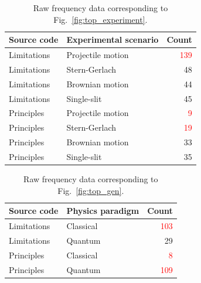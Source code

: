 \documentclass[english,aps,prstper,reprint,showpacs,longbibliography,superscriptaddress,nofootinbib]{revtex4-2}
\begin{document}
\begin{table}[tb] 
  \caption{Raw frequency data corresponding to Fig.~\ref{fig:top_experiment}.}
  \label{ta:top_experiment}
  \begin{ruledtabular}
    \begin{tabular}{llr}
    Source code & Experimental scenario & Count\\
    \hline
    Limitations & Projectile motion & \textcolor{red}{139}\\
    Limitations & Stern-Gerlach & 48\\
    Limitations & Brownian motion & 44\\
    Limitations & Single-slit & 45\\
    Principles & Projectile motion & \textcolor{red}{9}\\
    Principles & Stern-Gerlach & \textcolor{red}{19}\\
    Principles & Brownian motion & 33\\
    Principles & Single-slit & 35\\
    \end{tabular}
  \end{ruledtabular}
\end{table}

\begin{table}[tb] 
  \caption{Raw frequency data corresponding to Fig.~\ref{fig:top_gen}.}
  \label{ta:top_gen}
  \begin{ruledtabular}
    \begin{tabular}{llr}
    Source code & Physics paradigm & Count\\
    \hline
    Limitations & Classical & \textcolor{red}{103}\\
    Limitations & Quantum & 29\\
    Principles & Classical & \textcolor{red}{8} \\
    Principles & Quantum & \textcolor{red}{109}\\
    \end{tabular}
  \end{ruledtabular}
\end{table}

 
\end{document}
